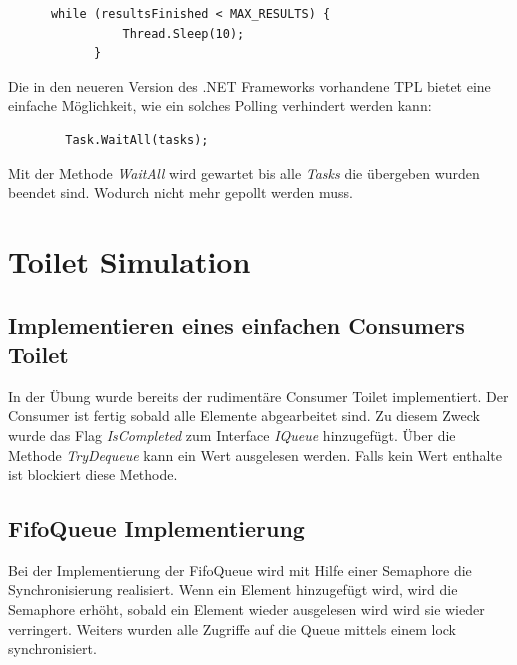 \documentclass[a4paper,ngerman]{scrartcl}
\begin{document}
\begin{lstlisting}
      while (resultsFinished < MAX_RESULTS) {
                Thread.Sleep(10);
            }
\end{lstlisting} 

Die in den neueren Version des .NET Frameworks vorhandene TPL bietet eine einfache Möglichkeit, wie ein solches Polling
verhindert werden kann:

\begin{lstlisting}
		Task.WaitAll(tasks);
\end{lstlisting}

Mit der Methode \textit{WaitAll} wird gewartet bis alle \textit{Tasks} die übergeben wurden beendet sind. Wodurch nicht
mehr gepollt werden muss.

\section{Toilet Simulation}
\subsection{Implementieren eines einfachen Consumers Toilet}

In der Übung wurde bereits der rudimentäre Consumer Toilet implementiert. Der Consumer ist fertig sobald alle Elemente abgearbeitet sind.
Zu diesem Zweck wurde das Flag \textit{IsCompleted} zum Interface \textit{IQueue} hinzugefügt. Über die Methode \textit{TryDequeue} kann 
ein Wert ausgelesen werden. Falls kein Wert enthalte ist blockiert diese Methode.

\subsection{FifoQueue Implementierung}
Bei der Implementierung der FifoQueue wird mit Hilfe einer Semaphore die Synchronisierung realisiert. Wenn ein Element hinzugefügt wird,
wird die Semaphore erhöht, sobald ein Element wieder ausgelesen wird wird sie wieder verringert. Weiters wurden alle Zugriffe auf die
Queue mittels einem lock synchronisiert.
\end{document}
